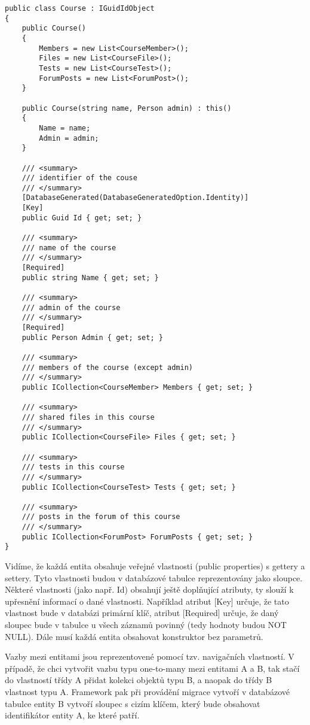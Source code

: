 \begin{lstlisting}
public class Course : IGuidIdObject
{
	public Course()
	{
		Members = new List<CourseMember>();
		Files = new List<CourseFile>();
		Tests = new List<CourseTest>();
		ForumPosts = new List<ForumPost>();
	}
	
	public Course(string name, Person admin) : this()
	{
		Name = name;
		Admin = admin;
	}
	
	/// <summary>
	/// identifier of the couse
	/// </summary>
	[DatabaseGenerated(DatabaseGeneratedOption.Identity)]
	[Key]
	public Guid Id { get; set; }
	
	/// <summary>
	/// name of the course
	/// </summary>
	[Required]
	public string Name { get; set; }
	
	/// <summary>
	/// admin of the course
	/// </summary>
	[Required]
	public Person Admin { get; set; }
	
	/// <summary>
	/// members of the course (except admin)
	/// </summary>
	public ICollection<CourseMember> Members { get; set; }
	
	/// <summary>
	/// shared files in this course
	/// </summary>
	public ICollection<CourseFile> Files { get; set; }
	
	/// <summary>
	/// tests in this course
	/// </summary>
	public ICollection<CourseTest> Tests { get; set; }
	
	/// <summary>
	/// posts in the forum of this course
	/// </summary>
	public ICollection<ForumPost> ForumPosts { get; set; }
}
\end{lstlisting}

Vidíme, že každá entita obsahuje veřejné vlastnosti (public properties) s gettery a settery. Tyto vlastnosti budou v databázové tabulce reprezentovány jako sloupce. Některé vlastnosti (jako např. Id) obsahují ještě doplňující atributy, ty slouží k upřesnění informací o dané vlastnosti. Například atribut [Key] určuje, že tato vlastnost bude v databázi primární klíč, atribut [Required] určuje, že daný sloupec bude v tabulce u všech záznamů povinný (tedy hodnoty budou NOT NULL).
Dále musí každá entita obsahovat konstruktor bez parametrů.

Vazby mezi entitami jsou reprezentovené pomocí tzv. navigačních vlastností. V případě, že chci vytvořit vazbu typu one-to-many mezi entitami A a B, tak stačí do vlastností třídy A přidat kolekci objektů typu B, a naopak do třídy B vlastnost typu A. Framework pak při provádění migrace vytvoří v databázové tabulce entity B vytvoří sloupec s cizím klíčem, který bude obsahovat identifikátor entity A, ke které patří.

